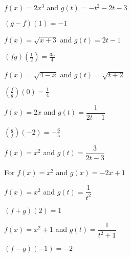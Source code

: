 \documentclass{ximera}
\begin{document}
\begin{question}
$f(x) = 2x^3$ and $g(t) = -t^2-2t-3$

\begin{solution}
$(g-f)(1) = -1$

\end{solution}

\end{question}

\begin{question}
$f(x) = \sqrt{x+3}$ and  $g(t) = 2t-1$
\begin{solution}
$(fg)\left(\frac{1}{2}\right) = \frac{35}{4}$
\end{solution}

\end{question}

\begin{question}
$f(x) = \sqrt{4-x}$ and $g(t) = \sqrt{t+2}$

\begin{solution}
$\left(\frac{f}{g}\right)(0) = \frac{1}{4}$
\end{solution}

\end{question}

\begin{question}
$f(x) = 2x$ and  $g(t) = \dfrac{1}{2t+1}$
\begin{solution}
$\left(\frac{g}{f}\right)\left(-2\right) = -\frac{6}{5}$

\end{solution}

\end{question}

\begin{question}
$f(x) = x^2$ and $g(t) = \dfrac{3}{2t-3}$

\begin{solution}
For  $f(x) = x^2$ and $g(x) = -2x+1$
\end{solution}

\end{question}

\begin{question}
$f(x) = x^2$ and  $g(t) = \dfrac{1}{t^2}$
\begin{solution}
$(f+g)(2) = 1$
\end{solution}

\end{question}

\begin{question}
$f(x) = x^2+1$ and $g(t) = \dfrac{1}{t^2+1}$ 

\begin{solution}
$(f-g)(-1) = -2$
\end{solution}

\end{question}
\end{document}
